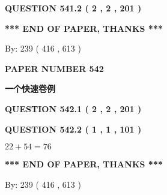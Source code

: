 \documentclass{ctexart}
\begin{document}
{\textbf{\Large{QUESTION
541.2 
 ( 2 , 2 , 201 )
}}}
  
  
   
   
 \vspace{0.2in}
 
   
   
   
   
\vspace{1.0in} 
{\textbf{\large{ *** END OF PAPER, THANKS *** }}} 
   
   
\hspace{1.0in} By: 
 239 ( 416 ,  613 )
   
   
   
   
\newpage 
\setcounter{page}{ 
   542001 } 
   
   
   
   
 {\textbf{ \Large{ PAPER NUMBER  542  }}}
   
   
\vspace{0.2in}
   
   
   
   
   
   
 \vspace{0.2in}
{\LARGE {\textbf{ 一个快速卷例}}}
   
   
  
\vspace{0.2in}
  
{\textbf{\Large{QUESTION
542.1 
 ( 2 , 2 , 201 )
}}}
  
  
  
\vspace{0.2in}
  
{\textbf{\Large{QUESTION
542.2 
 ( 1 , 1 , 101 )
}}}
  
  
 
 

$ %
22 +  %
54=   %
76$
 
 
   
   
 \vspace{0.2in}
 
   
   
   
   
\vspace{1.0in} 
{\textbf{\large{ *** END OF PAPER, THANKS *** }}} 
   
   
\hspace{1.0in} By: 
 239 ( 416 ,  613 )
   
   
   
   
\newpage 
\setcounter{page}{ 
   543001 } 
   
\end{document}
